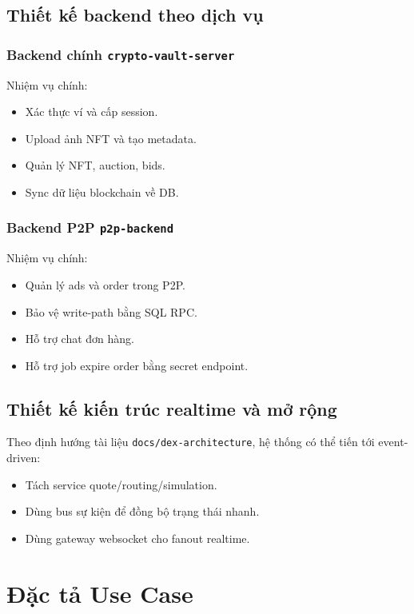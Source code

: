 \documentclass[a4paper,12pt]{report}
\begin{document}
\section{Thiết kế backend theo dịch vụ}
\subsection{Backend chính \texttt{crypto-vault-server}}
Nhiệm vụ chính:
\begin{itemize}
    \item Xác thực ví và cấp session.
    \item Upload ảnh NFT và tạo metadata.
    \item Quản lý NFT, auction, bids.
    \item Sync dữ liệu blockchain về DB.
\end{itemize}

\subsection{Backend P2P \texttt{p2p-backend}}
Nhiệm vụ chính:
\begin{itemize}
    \item Quản lý ads và order trong P2P.
    \item Bảo vệ write-path bằng SQL RPC.
    \item Hỗ trợ chat đơn hàng.
    \item Hỗ trợ job expire order bằng secret endpoint.
\end{itemize}

\section{Thiết kế kiến trúc realtime và mở rộng}
Theo định hướng tài liệu \texttt{docs/dex-architecture}, hệ thống có thể tiến tới event-driven:
\begin{itemize}
    \item Tách service quote/routing/simulation.
    \item Dùng bus sự kiện để đồng bộ trạng thái nhanh.
    \item Dùng gateway websocket cho fanout realtime.
\end{itemize}

\chapter{Đặc tả Use Case}
\end{document}
